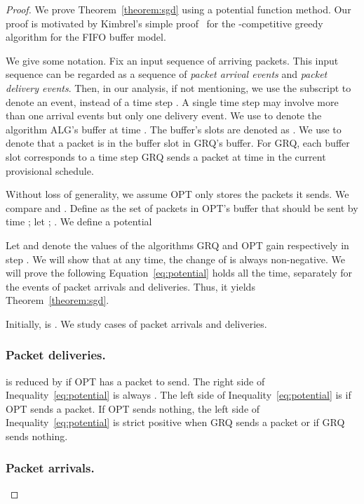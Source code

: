 \documentclass[final, 11pt]{article}
\begin{document}
\begin{proof}
We prove Theorem~\ref{theorem:sgd} using a potential function method. Our proof is motivated by Kimbrel's simple proof~\cite{K04} for the -competitive greedy algorithm for the FIFO buffer model.

We give some notation. Fix an input sequence of arriving packets. This input sequence can be regarded as a sequence of {\em packet arrival events} and {\em packet delivery events}. Then, in our analysis, if not mentioning, we use the subscript  to denote an event, instead of a time step . A single time step may involve more than one arrival events but only one delivery event. We use  to denote the algorithm ALG's buffer at time . The buffer's slots are denoted as . We use  to denote that a packet  is in the buffer slot  in GRQ's buffer. For GRQ, each buffer slot  corresponds to a time step GRQ sends a packet at time  in the current provisional schedule.

Without loss of generality, we assume OPT only stores the packets it sends. We compare  and . Define  as the set of packets in OPT's buffer that should be sent by time ; let ; . We define a potential


Let  and  denote the values of the algorithms GRQ and OPT gain respectively in step . We will show that at any time, the change of  is always non-negative. We will prove the following Equation~\ref{eq:potential} holds all the time, separately for the events of packet arrivals and deliveries. Thus, it yields Theorem~\ref{theorem:sgd}.



Initially,  is . We study cases of packet arrivals and deliveries.



\subsubsection{Packet deliveries.}

 is reduced by  if OPT has a packet to send. The right side of Inequality~\ref{eq:potential} is always . The left side of Inequality~\ref{eq:potential} is  if OPT sends a packet. If OPT sends nothing, the left side of Inequality~\ref{eq:potential} is strict positive when GRQ sends a packet or  if GRQ sends nothing.



\subsubsection{Packet arrivals.}


\end{proof}
\end{document}
